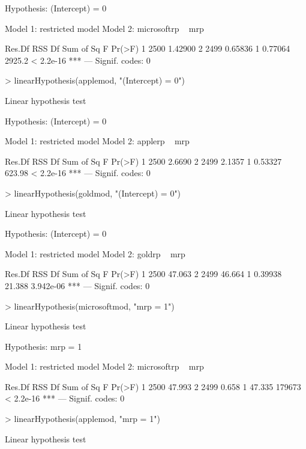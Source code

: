 \documentclass[12pt, a14paper, lithuanian]{article}
\begin{document}
\begin{Schunk}
\begin{Soutput}
Hypothesis:
(Intercept) = 0

Model 1: restricted model
Model 2: microsoftrp ~ mrp

  Res.Df     RSS Df Sum of Sq      F    Pr(>F)    
1   2500 1.42900                                  
2   2499 0.65836  1   0.77064 2925.2 < 2.2e-16 ***
---
Signif. codes:  0 
\end{Soutput}
\begin{Sinput}
> linearHypothesis(applemod, "(Intercept) = 0")
\end{Sinput}
\begin{Soutput}
Linear hypothesis test

Hypothesis:
(Intercept) = 0

Model 1: restricted model
Model 2: applerp ~ mrp

  Res.Df    RSS Df Sum of Sq      F    Pr(>F)    
1   2500 2.6690                                  
2   2499 2.1357  1   0.53327 623.98 < 2.2e-16 ***
---
Signif. codes:  0 
\end{Soutput}
\begin{Sinput}
> linearHypothesis(goldmod, "(Intercept) = 0")
\end{Sinput}
\begin{Soutput}
Linear hypothesis test

Hypothesis:
(Intercept) = 0

Model 1: restricted model
Model 2: goldrp ~ mrp

  Res.Df    RSS Df Sum of Sq      F    Pr(>F)    
1   2500 47.063                                  
2   2499 46.664  1   0.39938 21.388 3.942e-06 ***
---
Signif. codes:  0 
\end{Soutput}
\begin{Sinput}
> linearHypothesis(microsoftmod, "mrp = 1")
\end{Sinput}
\begin{Soutput}
Linear hypothesis test

Hypothesis:
mrp = 1

Model 1: restricted model
Model 2: microsoftrp ~ mrp

  Res.Df    RSS Df Sum of Sq      F    Pr(>F)    
1   2500 47.993                                  
2   2499  0.658  1    47.335 179673 < 2.2e-16 ***
---
Signif. codes:  0 
\end{Soutput}
\begin{Sinput}
> linearHypothesis(applemod, "mrp = 1")
\end{Sinput}
\begin{Soutput}
Linear hypothesis test


\end{Soutput}
\end{Schunk}
\end{document}
